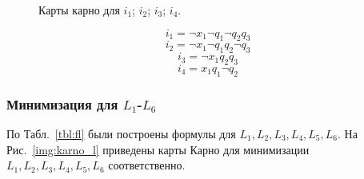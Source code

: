 \documentclass[a4paper, final]{article}
\begin{document}
\begin{figure}[H]
  \centering {}  
    \hspace{4ex}
    \hspace{4ex}
    \caption{Карты карно для  $i_1$;  $i_2$;  $i_3$;  $i_4$.
    }
    \label{img:karno_i}
  \end{figure}

\[i_1 = \neg x_1 \neg q_1 \neg q_2 q_3\]
\[i_2 = \neg x_1 \neg q_1 q_2 \neg q_3\]
\[i_3 = \neg x_1 q_2 q_3\]
\[i_4 = x_1 q_1 \neg q_2\]

\subsubsection{Минимизация для $L_1$-$L_6$}
По Табл.~\ref{tbl:fl} были построены формулы для $L_1, L_2, L_3, L_4, L_5, L_6$. На Рис.~\ref{img:karno_l} приведены карты Карно для минимизации $L_1, L_2, L_3, L_4, L_5, L_6$ соответственно.
\end{document}

